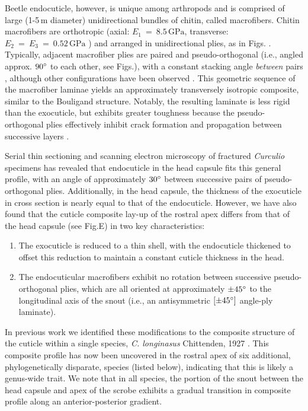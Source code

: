 \documentclass[twocolumn, linenumbers, superscriptaddress]{revtex4-1}
\begin{document}
		Beetle endocuticle, however, is unique among arthropods and is comprised of large (1-5\,{\textmu}m diameter) unidirectional bundles of chitin, called macrofibers.
		Chitin macrofibers are orthotropic (axial: $E_1~=~8.5\,\text{GPa}$, transverse: $ E_2~=~E_3~=~0.52\,\text{GPa}$ \cite{Jansen2016}) and arranged in unidirectional plies, as in Figs.  \cite{Kamp2010,Kamp2015}.
		Typically, adjacent macrofiber plies are paired and pseudo-orthogonal (i.e., angled approx. $90\degree$ to each other, see Figs.), with a constant stacking angle \emph{between} pairs , although other configurations have been observed \cite{Hepburn1973,Kamp2010}.
		This geometric sequence of the macrofiber laminae yields an approximately transversely isotropic composite, similar to the Bouligand structure.
		Notably, the resulting laminate is less rigid than the exocuticle, but exhibits greater toughness because the pseudo-orthogonal plies effectively inhibit crack formation and propagation between successive layers \cite{Kamp2010,Kamp2015,Hepburn1973}.
		
		Serial thin sectioning and scanning electron microscopy of fractured \textit{Curculio} specimens has revealed that endocuticle in the head capsule fits this general profile, with an angle of approximately $30\degree$ between successive pairs of pseudo-orthogonal plies.
		Additionally, in the head capsule, the thickness of the exocuticle in cross section is nearly equal to that of the endocuticle.
		However, we have also found that the cuticle composite lay-up of the rostral apex differs from that of the head capsule (see Fig.E) in two key characteristics:

		\begin{enumerate}
			\item The exocuticle is reduced to a thin shell, with the endocuticle thickened  to offset this reduction to maintain a constant cuticle thickness in the head.
			\item The endocuticular macrofibers exhibit no rotation between successive pseudo-orthogonal plies, which are all oriented at approximately $\pm45\degree$ to the longitudinal axis of the snout (i.e., an antisymmetric $[\pm45\degree]$ angle-ply laminate).
		\end{enumerate}
		
		In previous work we identified these modifications to the composite structure of the cuticle within a single species, \textit{C. longinasus} Chittenden, 1927 \cite{Jansen2016, Singh2016}.
		This composite profile has now been uncovered in the rostral apex of six additional, phylogenetically disparate, species (listed below), indicating that this is likely a genus-wide trait.
		We note that in all species, the portion of the snout between the head capsule and apex of the scrobe exhibits a gradual transition in composite profile along an anterior-posterior gradient.
		
\end{document}
